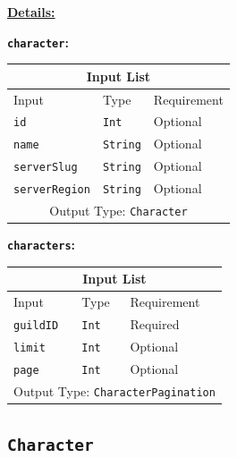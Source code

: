 \documentclass[10pt, a4paper]{memoir}
\numberwithin{equation}{section}
\theoremstyle{plain}
\theoremstyle{defp}
\theoremstyle{dotless}
\theoremstyle{definition}
\theoremstyle{dotless}
\theoremstyle{dotless}
\theoremstyle{defp}
\theoremstyle{defp}
\theoremstyle{be}          %
\theoremstyle{defp}
\newcommand\ttt[1]{\texttt{#1}}
\begin{document}
\underline{\textbf{Details:}}

\textbf{\ttt{character}:}

\begin{table}[h]
	\centering
	\begin{tabular}{ |p{3cm}|p{3cm}|p{3cm}|  }
		\hline
		\multicolumn{3}{|c|}{Input List} \\
		\hline
		Input & Type & Requirement\\
		\hline
		\ttt{id}   & \ttt{Int} & Optional\\
		\ttt{name}& \ttt{String} & Optional\\
		\ttt{serverSlug} & \ttt{String} & Optional\\
		\ttt{serverRegion}    & \ttt{String} & Optional\\
		\hline
		\multicolumn{3}{|c|}{Output Type: \ttt{Character}} \\
		\hline
	\end{tabular}
\end{table}



\smallskip

\textbf{\ttt{characters}:}

\begin{table}[h]
	\centering
	\begin{tabular}{ |p{3cm}|p{3cm}|p{3cm}|  }
		\hline
		\multicolumn{3}{|c|}{Input List} \\
		\hline
		Input & Type & Requirement\\
		\hline
		\ttt{guildID}   & \ttt{Int} & Required\\
		\ttt{limit}& \ttt{Int} & Optional\\
		\ttt{page} & \ttt{Int} & Optional\\
		\hline
		\multicolumn{3}{|c|}{Output Type: \ttt{CharacterPagination}} \\
		\hline
	\end{tabular}
\end{table}

\subsection{\ttt{Character}}\label{sec:Character}
\end{document}
